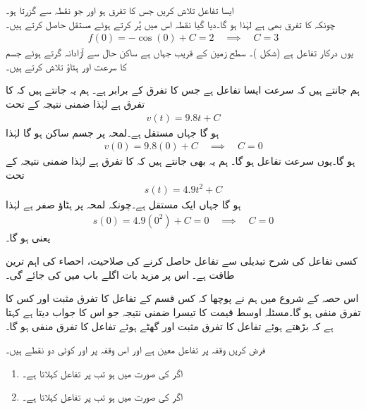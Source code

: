 ایسا تفاعل  تلاش کریں جس کا تفرق  ہو اور جو نقطہ  سے گزرتا ہو۔\\
چونکہ  کا تفرق بھی  ہے لہٰذا  ہو گا۔دیا گیا نقطہ اس میں پُر کرتے ہوئے مستقل حاصل کرتے ہیں۔
\begin{align*}
f(0)=-\cos(0)+C=2\quad \implies\quad C=3
\end{align*} 
یوں درکار تفاعل  ہے (شکل )۔
سطح زمین کے قریب جہاں  ہے ساکن حال سے آزادانہ گرتے ہوئے جسم کا  سرعت اور ہٹاؤ تلاش کرتے ہیں۔

ہم جانتے ہیں کہ سرعت  ایسا تفاعل ہے جس کا تفرق  کے برابر ہے۔ ہم یہ جانتے ہیں کہ  کا تفرق  ہے لہٰذا ضمنی نتیجہ  کے تحت
\begin{align*}
v(t)=9.8t+C
\end{align*}
ہو گا جہاں  مستقل ہے۔لمحہ  پر جسم ساکن ہو گا لہٰذا
\begin{align*}
v(0)=9.8(0)+C\quad \implies \quad C=0 
\end{align*}
ہو گا۔یوں سرعت تفاعل  ہو گا۔ ہم یہ بھی جانتے ہیں کہ  کا تفرق  ہے لہٰذا  ضمنی نتیجہ  کے تحت
\begin{align*}
s(t)=4.9t^2+C
\end{align*}
ہو گا جہاں   ایک مستقل ہے۔چونکہ لمحہ  پر ہٹاؤ صفر ہے لہٰذا
\begin{align*}
s(0)=4.9(0^2)+C=0\quad \implies \quad C=0
\end{align*} 
یعنی  ہو گا۔

کسی تفاعل کی شرح تبدیلی سے تفاعل حاصل کرنے کی صلاحیت، احصاء کی اہم ترین طاقت ہے۔ اس پر مزید بات اگلے باب میں کی جائے گی۔

اس حصہ کے شروع میں ہم نے پوچھا کہ کس قسم کے تفاعل کا تفرق مثبت اور کس کا تفرق منفی ہو گا۔مسئلہ اوسط قیمت کا تیسرا ضمنی نتیجہ جو اس کا جواب دیتا ہے کہتا ہے کہ بڑھتے ہوئے تفاعل کا تفرق مثبت اور گھٹے ہوئے تفاعل کا تفرق منفی ہو گا۔

فرض کریں وقفہ  پر تفاعل  معین ہے اور اس وقفہ پر  اور  کوئی  دو نقطے ہیں۔
\begin{enumerate}[1.]
\item
اگر  کی صورت میں  ہو تب  پر   تفاعل کہلاتا ہے۔
\item
اگر  کی صورت میں  ہو تب  پر   تفاعل کہلاتا  ہے۔
\end{enumerate}

